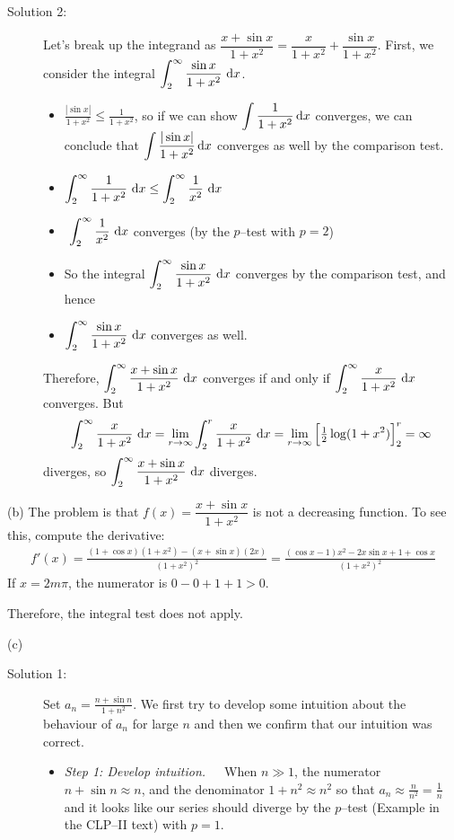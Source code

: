 \begin{solution}
\begin{description}
\item[Solution 2:]
Let's break up the integrand as $\dfrac{x+\sin x}{1+x^2} = \dfrac{x}{1+x^2}+\dfrac{\sin x}{1+x^2}$. First, we consider  the integral $\displaystyle \int_2^\infty\frac{\sin x}{1+x^2}\ \mathrm{d}x$.
\begin{itemize}
\item  $\displaystyle\frac{|\sin x|}{1+x^2}\le \frac{1}{1+x^2}$, so if we can show $\displaystyle\int \frac{1}{1+x^2}\,\mathrm{d}x$ converges, we can conclude that $\displaystyle\int\frac{|\sin x|}{1+x^2}\,\mathrm{d}x$ converges as well by the comparison test.
\item  $\displaystyle\int_2^\infty\frac{1}{1+x^2}\ \dee{x}\le \int_2^\infty\frac{1}{x^2}\ \dee{x}$
\item  $\displaystyle\ \int_2^\infty\frac{1}{x^2}\ \dee{x}$
converges (by the $p$--test with $p=2$)
\item So the integral $\displaystyle \int_2^\infty\frac{\sin x}{1+x^2}\ \mathrm{d}x$ converges by the comparison test, and hence
\item  $\displaystyle \int_2^\infty\frac{\sin x}{1+x^2}\ \mathrm{d}x$ converges as well.
\end{itemize}
Therefore, $\displaystyle \int_2^\infty\frac{x+\sin x}{1+x^2}\ \dee{x}$ converges if and only
if $\displaystyle \int_2^\infty\frac{x}{1+x^2}\ \mathrm{d}x$ converges. But
\begin{align*}
\int_2^\infty\frac{x}{1+x^2}\ \mathrm{d}x
=\lim_{r\rightarrow\infty}\int_2^r\frac{x}{1+x^2}\ \mathrm{d}x
=\lim_{r\rightarrow\infty}\Big[\tfrac{1}{2}\log(1+x^2)\Big]_2^r=\infty
\end{align*}
diverges, so $ \displaystyle\int_2^\infty\frac{x+\sin x}{1+x^2}\ \dee{x}$
diverges.
\end{description}

\noindent (b)
The problem is that $f(x)=\dfrac{x+\sin x}{1+x^2}$ is not
a decreasing function. To see this, compute the derivative:
\begin{align*}
f'(x)=\frac{(1+\cos x)(1+x^2)-(x+\sin x)(2x)}{{(1+x^2)}^2}
=\frac{(\cos x-1)x^2-2x\sin x +1+\cos x}{{(1+x^2)}^2}
\end{align*}
If $x=2m\pi$, the numerator is $0-0+1+1>0$.

Therefore, the integral test does not apply.

\noindent (c)
\begin{description}
\item[Solution 1:]
Set $a_n=  \frac{n+\sin n}{1+n^2}$.  We first try to develop some
intuition about the behaviour of $a_n$ for large $n$ and then we confirm
that our intuition was correct.
\begin{itemize}
\item \emph{Step 1: Develop intuition.}\ \ \
When $n\gg 1$,
the numerator $n+\sin n\approx n$, and the denominator
$1+n^2\approx n^2$ so that
$a_n\approx \frac{n}{n^2}=\frac{1}{n}$ and it looks like
our series should diverge by the $p$--test (Example 
in the CLP--II text) with $p=1$.


\end{itemize}
\end{description}
\end{solution}
